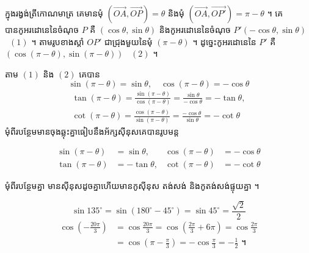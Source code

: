 ក្នុងរង្វង់ត្រីកោណមាត្រ គេមានមុំ $(\overrightarrow{OA}, \overrightarrow{OP}) = \theta$ និងមុំ $(\overrightarrow{OA}, \overrightarrow{OP'}) = \pi - \theta$ ។ គេបានកូអរដោនេនៃចំណុច $P$ គឺ $(\cos\theta, \sin\theta)$ និងកូអរដោនេនៃចំណុច $P'(-\cos\theta, \sin\theta)$ \ $(1)$ ។ តាមរូបខាងស្តាំ $OP'$ ជាជ្រុងមួយនៃមុំ $(\pi - \theta)$ ។ ដូច្នេះកូអរដោនេនៃ $P'$ គឺ $(\cos(\pi - \theta), \sin(\pi - \theta))$ \ $(2)$ ។
\begin{center}
\end{center}
តាម $(1)$ និង $(2)$ គេបាន
\[ \sin(\pi - \theta) = \sin\theta, \quad \cos(\pi - \theta) = -\cos\theta \]
\[
\begin{gathered}
\tan(\pi - \theta) = \frac{\sin(\pi - \theta)}{\cos(\pi - \theta)} = \frac{\sin\theta}{-\cos\theta} = -\tan\theta,\\
\cot(\pi - \theta) = \frac{\cos(\pi - \theta)}{\sin(\pi - \theta)} = \frac{-\cos\theta}{\sin\theta} = -\cot\theta
\end{gathered}
\]
មុំពីរបន្ថែមមានចុងឆ្លុះគ្នាធៀបនឹងអ័ក្សស៊ីនុសគេបានរូបមន្ត
\begin{formulaBox}[រូបមន្ត]
\[
\begin{aligned}
\sin(\pi - \theta) &= \sin\theta, & \cos(\pi - \theta) &= -\cos\theta\\
\tan(\pi - \theta) &= -\tan\theta, & \cot(\pi - \theta) &= -\cot\theta
\end{aligned}
\]
\end{formulaBox}
\begin{note}[សម្គាល់]
មុំពីរបន្ថែមគ្នា មានស៊ីនុសដូចគ្នាហើយមានកូស៊ីនុស តង់សង់ និងកូតង់សង់ផ្ទុយគ្នា ។
\end{note}
\begin{example}[ឧទាហរណ៍]
\[ \sin 135^\circ = \sin(180^\circ - 45^\circ) = \sin 45^\circ = \frac{\sqrt{2}}{2} \]
\[
\begin{aligned}
\cos\left(-\frac{20\pi}{3}\right) &= \cos\frac{20\pi}{3} = \cos\left(\frac{2\pi}{3} + 6\pi\right) = \cos\frac{2\pi}{3}\\
&= \cos\left(\pi - \frac{\pi}{3}\right) = -\cos\frac{\pi}{3} = -\frac{1}{2} \text{ ។}
\end{aligned}
\]
\end{example}

